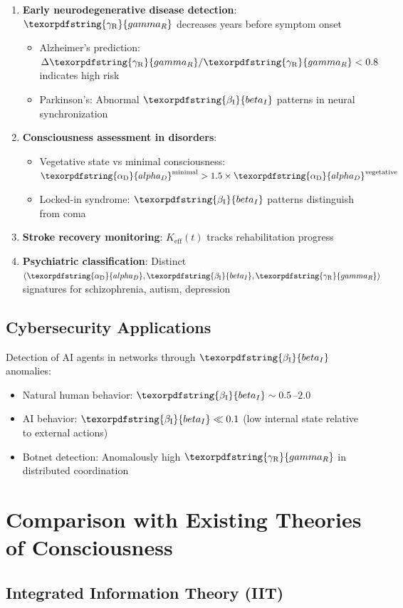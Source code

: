 \documentclass[12pt,a4paper]{article}
\DeclareRobustCommand{\alD}{\texorpdfstring{\ensuremath{\alpha_{\mathrm{D}}}}{alpha_D}}
\DeclareRobustCommand{\beI}{\texorpdfstring{\ensuremath{\beta_{\mathrm{I}}}}{beta_I}}
\DeclareRobustCommand{\gaR}{\texorpdfstring{\ensuremath{\gamma_{\mathrm{R}}}}{gamma_R}}
\newcommand{\eff}{\mathrm{eff}}
\newcommand{\Ke}{K_{\eff}}
\begin{document}
	\begin{enumerate}
		\item \textbf{Early neurodegenerative disease detection}: \(\gaR\) decreases years before symptom onset
		\begin{itemize}
			\item Alzheimer's prediction: \(\Delta\gaR/\gaR < 0.8\) indicates high risk
			\item Parkinson's: Abnormal \(\beI\) patterns in neural synchronization
		\end{itemize}
		
		\item \textbf{Consciousness assessment in disorders}:
		\begin{itemize}
			\item Vegetative state vs minimal consciousness: \(\alD^{\mathrm{minimal}} > 1.5 \times \alD^{\mathrm{vegetative}}\)
			\item Locked-in syndrome: \(\beI\) patterns distinguish from coma
		\end{itemize}
		
		\item \textbf{Stroke recovery monitoring}: \(\Ke(t)\) tracks rehabilitation progress
		\item \textbf{Psychiatric classification}: Distinct \((\alD, \beI, \gaR)\) signatures for schizophrenia, autism, depression
	\end{enumerate}
	
	\subsection{Cybersecurity Applications}
	
	Detection of AI agents in networks through \(\beI\) anomalies:
	\begin{itemize}
		\item Natural human behavior: \(\beI \sim 0.5\)--\(2.0\)
		\item AI behavior: \(\beI \ll 0.1\) (low internal state relative to external actions)
		\item Botnet detection: Anomalously high \(\gaR\) in distributed coordination
	\end{itemize}
	
	\section{Comparison with Existing Theories of Consciousness}
	
	\subsection{Integrated Information Theory (IIT)}
	
\end{document}
